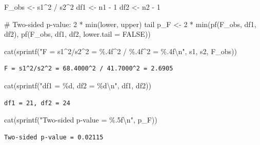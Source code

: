 \documentclass[
  letterpaper,
  DIV=11,
  numbers=noendperiod]{scrartcl}
\newenvironment{Shaded}{\begin{snugshade}}{\end{snugshade}}
\newcommand{\AttributeTok}[1]{\textcolor[rgb]{0.40,0.45,0.13}{#1}}
\newcommand{\CommentTok}[1]{\textcolor[rgb]{0.37,0.37,0.37}{#1}}
\newcommand{\ConstantTok}[1]{\textcolor[rgb]{0.56,0.35,0.01}{#1}}
\newcommand{\DecValTok}[1]{\textcolor[rgb]{0.68,0.00,0.00}{#1}}
\newcommand{\FunctionTok}[1]{\textcolor[rgb]{0.28,0.35,0.67}{#1}}
\newcommand{\NormalTok}[1]{\textcolor[rgb]{0.00,0.23,0.31}{#1}}
\newcommand{\OtherTok}[1]{\textcolor[rgb]{0.00,0.23,0.31}{#1}}
\newcommand{\SpecialCharTok}[1]{\textcolor[rgb]{0.37,0.37,0.37}{#1}}
\newcommand{\StringTok}[1]{\textcolor[rgb]{0.13,0.47,0.30}{#1}}
\begin{document}
\begin{Shaded}
\begin{Highlighting}[]
\NormalTok{F\_obs  }\OtherTok{\textless{}{-}}\NormalTok{ s1}\SpecialCharTok{\^{}}\DecValTok{2} \SpecialCharTok{/}\NormalTok{ s2}\SpecialCharTok{\^{}}\DecValTok{2}
\NormalTok{df1    }\OtherTok{\textless{}{-}}\NormalTok{ n1 }\SpecialCharTok{{-}} \DecValTok{1}
\NormalTok{df2    }\OtherTok{\textless{}{-}}\NormalTok{ n2 }\SpecialCharTok{{-}} \DecValTok{1}

\CommentTok{\# Two{-}sided p{-}value: 2 * min(lower, upper) tail}
\NormalTok{p\_F }\OtherTok{\textless{}{-}} \DecValTok{2} \SpecialCharTok{*} \FunctionTok{min}\NormalTok{(}\FunctionTok{pf}\NormalTok{(F\_obs, df1, df2), }\FunctionTok{pf}\NormalTok{(F\_obs, df1, df2, }\AttributeTok{lower.tail =} \ConstantTok{FALSE}\NormalTok{))}

\FunctionTok{cat}\NormalTok{(}\FunctionTok{sprintf}\NormalTok{(}\StringTok{"F = s1\^{}2/s2\^{}2 = \%.4f\^{}2 / \%.4f\^{}2 = \%.4f}\SpecialCharTok{\textbackslash{}n}\StringTok{"}\NormalTok{, s1, s2, F\_obs))}
\end{Highlighting}
\end{Shaded}

\begin{verbatim}
F = s1^2/s2^2 = 68.4000^2 / 41.7000^2 = 2.6905
\end{verbatim}

\begin{Shaded}
\begin{Highlighting}[]
\FunctionTok{cat}\NormalTok{(}\FunctionTok{sprintf}\NormalTok{(}\StringTok{"df1 = \%d, df2 = \%d}\SpecialCharTok{\textbackslash{}n}\StringTok{"}\NormalTok{, df1, df2))}
\end{Highlighting}
\end{Shaded}

\begin{verbatim}
df1 = 21, df2 = 24
\end{verbatim}

\begin{Shaded}
\begin{Highlighting}[]
\FunctionTok{cat}\NormalTok{(}\FunctionTok{sprintf}\NormalTok{(}\StringTok{"Two{-}sided p{-}value = \%.5f}\SpecialCharTok{\textbackslash{}n}\StringTok{"}\NormalTok{, p\_F))}
\end{Highlighting}
\end{Shaded}

\begin{verbatim}
Two-sided p-value = 0.02115
\end{verbatim}
\end{document}
